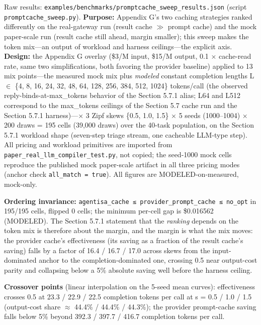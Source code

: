 \documentclass[
  11pt,
]{article}
\begin{document}
Raw results:
\texttt{examples/benchmarks/promptcache\_sweep\_results.json} (script
\texttt{promptcache\_sweep.py}). \textbf{Purpose:} Appendix G's two
caching strategies ranked differently on the real-gateway run (result
cache \(\gg\) prompt cache) and the mock paper-scale run (result cache
still ahead, margin smaller); this sweep makes the token mix---an output
of workload and harness ceilings---the explicit axis. \textbf{Design:}
the Appendix G overlay (\$3/M input, \$15/M output, 0.1 \(\times\)
cache-read rate, same two simplifications, both favoring the provider
baseline) applied to 13 mix points---the measured mock mix plus
\emph{modeled} constant completion lengths L \(\in\) \{4, 8, 16, 24, 32,
48, 64, 128, 256, 384, 512, 1024\} tokens/call (the observed
reply-binds-at-max\_tokens behavior of the Section 5.7.1 alias; L64 and
L512 correspond to the max\_tokens ceilings of the Section 5.7 cache run
and the Section 5.7.1 harness)---\(\times\) 3 Zipf skews \{0.5, 1.0,
1.5\} \(\times\) 5 seeds (1000--1004) \(\times\) 200 draws = 195 cells
(39,000 draws) over the 40-task population, on the Section 5.7.1
workload shape (seven-step triage stream, one cacheable LLM-type step).
All pricing and workload primitives are imported from
\texttt{paper\_real\_llm\_compiler\_test.py}, not copied; the seed-1000
mock cells reproduce the published mock paper-scale artifact in all
three pricing modes (anchor check \texttt{all\_match\ =\ true}). All
figures are MODELED-on-measured, mock-only.

\textbf{Ordering invariance:}
\texttt{agentisa\_cache\ ≤\ provider\_prompt\_cache\ ≤\ no\_opt} in
195/195 cells, flipped 0 cells; the minimum per-cell gap is \$0.016562
(MODELED). The Section 5.7.1 statement that the \emph{ranking} depends
on the token mix is therefore about the margin, and the margin is what
the mix moves: the provider cache's effectiveness (its saving as a
fraction of the result cache's saving) falls by a factor of 16.4 / 16.7
/ 17.0 across skews from the input-dominated anchor to the
completion-dominated one, crossing 0.5 near output-cost parity and
collapsing below a 5\% absolute saving well before the harness ceiling.

\textbf{Crossover points} (linear interpolation on the 5-seed mean
curves): effectiveness crosses 0.5 at 23.3 / 22.9 / 22.5 completion
tokens per call at s = 0.5 / 1.0 / 1.5 (output-cost share \(\approx\)
44.4\% / 44.4\% / 44.3\%); the provider prompt-cache saving falls below
5\% beyond 392.3 / 397.7 / 416.7 completion tokens per call.
\end{document}
